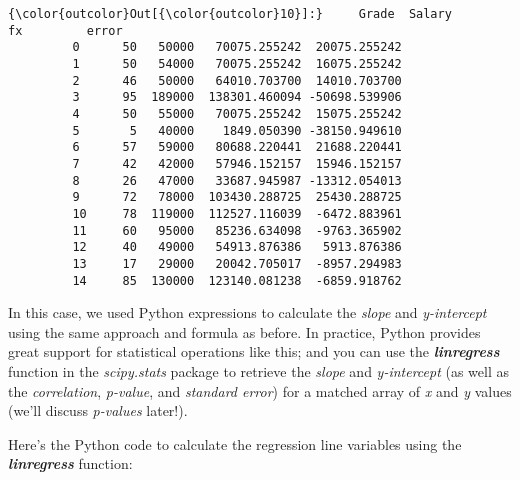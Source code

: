 \documentclass[11pt]{article}
\begin{document}
\begin{Verbatim}[commandchars=\\\{\}]
{\color{outcolor}Out[{\color{outcolor}10}]:}     Grade  Salary             fx         error
         0      50   50000   70075.255242  20075.255242
         1      50   54000   70075.255242  16075.255242
         2      46   50000   64010.703700  14010.703700
         3      95  189000  138301.460094 -50698.539906
         4      50   55000   70075.255242  15075.255242
         5       5   40000    1849.050390 -38150.949610
         6      57   59000   80688.220441  21688.220441
         7      42   42000   57946.152157  15946.152157
         8      26   47000   33687.945987 -13312.054013
         9      72   78000  103430.288725  25430.288725
         10     78  119000  112527.116039  -6472.883961
         11     60   95000   85236.634098  -9763.365902
         12     40   49000   54913.876386   5913.876386
         13     17   29000   20042.705017  -8957.294983
         14     85  130000  123140.081238  -6859.918762
\end{Verbatim}
            
    In this case, we used Python expressions to calculate the \emph{slope}
and \emph{y-intercept} using the same approach and formula as before. In
practice, Python provides great support for statistical operations like
this; and you can use the \textbf{\emph{linregress}} function in the
\emph{scipy.stats} package to retrieve the \emph{slope} and
\emph{y-intercept} (as well as the \emph{correlation}, \emph{p-value},
and \emph{standard error}) for a matched array of \emph{x} and \emph{y}
values (we'll discuss \emph{p-values} later!).

Here's the Python code to calculate the regression line variables using
the \textbf{\emph{linregress}} function:
\end{document}

